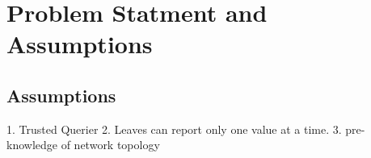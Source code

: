 \chapter{Problem Statment and Assumptions}

\section{Assumptions}
1. Trusted Querier
2. Leaves can report only one value at a time.
3. pre-knowledge of network topology